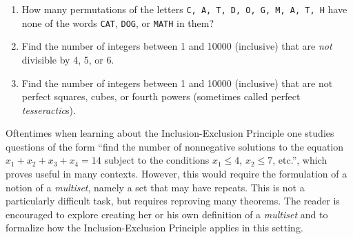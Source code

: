 \begin{examples}\leavevmode
\begin{enumerate}
    \item How many permutations of the letters \texttt{C, A, T, D, O, G, M, A, T, H} have none of the words \texttt{CAT}, \texttt{DOG}, or \texttt{MATH} in them?
    \item Find the number of integers between 1 and 10000 (inclusive) that are \textit{not} divisible by 4, 5, or 6.
    \item Find the number of integers between 1 and 10000 (inclusive) that are not perfect squares, cubes, or fourth powers (sometimes called perfect \textit{tesseractic}s).
\end{enumerate}
\end{examples}

\begin{remark} Oftentimes when learning about the Inclusion-Exclusion Principle one studies questions of the form ``find the number of nonnegative solutions to the equation $x_1 + x_2 + x_3 + x_4 = 14$ subject to the conditions $x_1 \leq 4$, $x_2 \leq 7$, etc.'', which proves useful in many contexts.  However, this would require the formulation of a notion of a \textit{multiset}, namely a set that may have repeats.  This is not a particularly difficult task, but requires reproving many theorems.  The reader is encouraged to explore creating her or his own definition of a \textit{multiset} and to formalize how the Inclusion-Exclusion Principle applies in this setting.
\end{remark}
